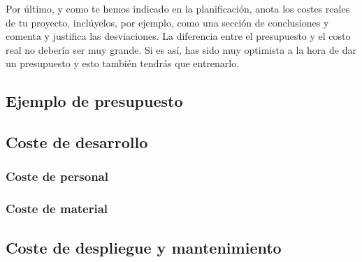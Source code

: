 Por último, y como te hemos indicado en la planificación, anota los costes reales de tu proyecto, inclúyelos, por ejemplo, como una sección de conclusiones y comenta y justifica las desviaciones. La diferencia entre el presupuesto y el costo real no debería ser muy grande. Si es así, has sido muy optimista a la hora de dar un presupuesto y esto también tendrás que entrenarlo.

\subsection{Ejemplo de presupuesto}

\subsection{Coste de desarrollo}

\subsubsection{Coste de personal}

\subsubsection{Coste de material}

\subsection{Coste de despliegue y mantenimiento}
